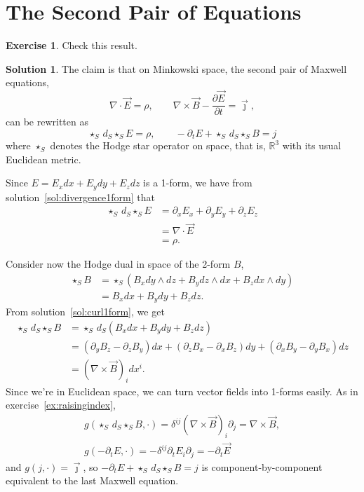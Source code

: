 \documentclass[11pt, a4paper]{report}
\theoremstyle{definition}
\newtheorem{ex}{Exercise}[part]
\newtheorem{sol}{Solution}[part]
\begin{document}
\section{The Second Pair of Equations}\label{sec:secondpairmaxwellequations}

\begin{ex}

Check this result.

\end{ex}

\begin{sol}

The claim is that on Minkowski space, the second pair of Maxwell equations,
\[
    \nabla \cdot \vec{E} = \rho, \qquad
    \nabla \times \vec{B} - \frac{\partial \vec{E}}{\partial t} = \vec{\jmath},
\]
can be rewritten as
\[
    \star_S \, d_S \star_S E = \rho, \qquad
    -\partial_t E + \star_S \, d_S \star_S B = j
\]
where $\star_S$ denotes the Hodge star operator on space, that is, $\mathbb{R}^3$ with its usual Euclidean metric.

Since $E = E_x dx + E_y dy + E_z dz$ is a 1-form, we have from solution~\ref{sol:divergence1form} that
\begin{align*}
    \star_S \, d_S \star_S E &= \partial_x E_x + \partial_y E_y + \partial_z E_z \\
                             &= \nabla \cdot \vec{E} \\
                             &= \rho.
\end{align*}

Consider now the Hodge dual in space of the 2-form $B$,
\begin{align*}
    \star_S B &= \star_S (B_x dy \wedge dz + B_y dz \wedge dx + B_z dx \wedge dy) \\
              &= B_x dx + B_y dy + B_z dz.
\end{align*}
From solution~\ref{sol:curl1form}, we get
\begin{align*}
    \star_S \, d_S \star_S B &= \star_S \, d_S (B_x dx + B_y dy + B_z dz) \\
        &= \left(\partial_y B_z - \partial_z B_y\right) dx
            + \left(\partial_z B_x - \partial_x B_z\right) dy
            + \left(\partial_x B_y - \partial_y B_x\right) dz \\
        &= {(\nabla \times \vec{B})}_i dx^i.
\end{align*}
Since we're in Euclidean space, we can turn vector fields into 1-forms easily. As in exercise~\ref{ex:raisingindex},
\begin{gather*}
    g(\star_S \, d_S \star_S B, \cdot)
        = \delta^{ij} {(\nabla \times \vec{B})}_i \partial_j
        = \nabla \times \vec{B}, \\
    g(-\partial_t E, \cdot) = -\delta^{ij} \partial_t E_i \partial_j = -\partial_t \vec{E}
\end{gather*}
and $g(j, \cdot) = \vec{\jmath}$,
so $-\partial_t E + \star_S \, d_S \star_S B = j$ is component-by-component equivalent to the last Maxwell equation.

\end{sol}
\end{document}
